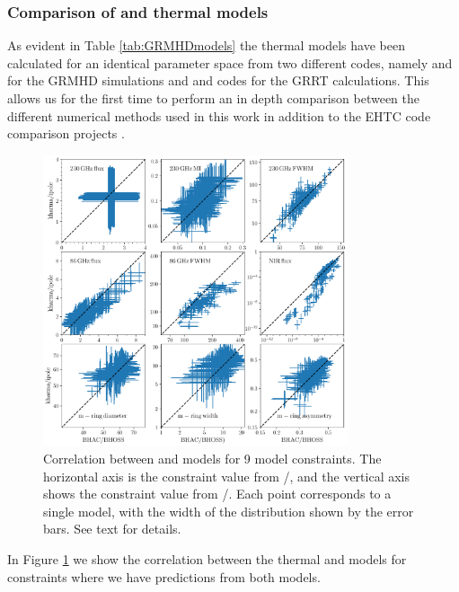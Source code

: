 
\subsubsection{Comparison of \kharma and \bhac thermal models}

As evident in Table \ref{tab:GRMHDmodels} the thermal models have been calculated for an identical parameter space from two different codes, namely \kharma and \bhac for the GRMHD simulations and \ipole and \bhoss codes for the GRRT calculations. This allows us for the first time to perform an in depth comparison between the different numerical methods used in this work in addition to the EHTC code comparison projects \citep{2019ApJS..243...26P,2020ApJ...897..148G}.

\begin{figure}
  \centering
  \includegraphics[width=0.8\textwidth]{./figures/BHAC_iharm_correlation2}
  \caption{Correlation between \bhac and \kharma models for 9 model constraints.  The horizontal axis is the constraint value from \bhac/\bhoss, and the vertical axis shows the constraint value from \kharma/\ipole.  Each point corresponds to a single model, with the width of the distribution shown by the error bars.  See text for details.}
  \label{fig:modelcorrelation}
\end{figure}

In Figure \ref{fig:modelcorrelation} we show the correlation between the thermal \kharma and \bhac models for constraints where we have predictions from both models.

